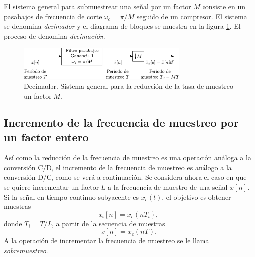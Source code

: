 \documentclass[a4paper]{report}
\begin{document}
El sistema general para submuestrear una señal por un factor \(M\) consiste en un pasabajos de frecuencia de corte \(\omega_c=\pi/M\) seguido de un compresor. El sistema se denomina \emph{decimador} y el diagrama de bloques se muestra en la figura \ref{fig:sampling_decimator}. El proceso de denomina \emph{decimación}.
\begin{figure}[!htb]
 \begin{center}
 \includegraphics[width=0.74\textwidth]{figuras/sampling_decimator.pdf}
 \caption{\label{fig:sampling_decimator} Decimador. Sistema general para la reducción de la tasa de muestreo un factor \(M\).}
 \end{center}
\end{figure}

\subsection{Incremento de la frecuencia de muestreo por un factor entero}

Así como la reducción de la frecuencia de muestreo es una operación análoga a la conversión C/D, el incremento de la frecuencia de muestreo es análogo a la conversión D/C, como se verá a continuación. Se considera ahora el caso en que se quiere incrementar un factor \(L\) a la frecuencia de muestro de una señal \(x[n]\). Si la señal en tiempo continuo subyacente es \(x_c(t)\), el objetivo es obtener muestras
\begin{equation}\label{eq:sampling_upsampling_definition}
 x_i[n]=x_c(nT_i), 
\end{equation}
donde \(T_i=T/L\), a partir de la secuencia de muestras
\[
 x[n]=x_c(nT).
\]
A la operación de incrementar la frecuencia de muestreo se le llama \emph{sobremuestreo}.
\end{document}
